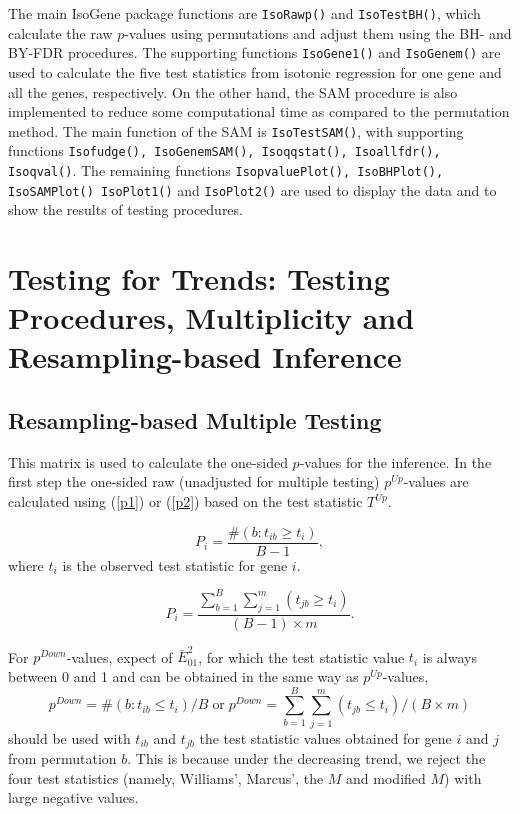 The main IsoGene package functions are \texttt{IsoRawp()} and
\texttt{IsoTestBH()}, which calculate the raw $p$-values using
permutations and adjust them using the BH- and BY-FDR procedures.
The supporting functions \texttt{IsoGene1()} and \texttt{IsoGenem()}
are used to calculate the five test statistics from isotonic
regression for one gene and all the genes, respectively. On the other hand,
the SAM procedure is also implemented to reduce some computational time as
compared to the permutation method. The main function of the SAM is \texttt{IsoTestSAM()},
with supporting functions \texttt{Isofudge(), IsoGenemSAM(), Isoqqstat(), Isoallfdr(), Isoqval()}.
The remaining functions \texttt{IsopvaluePlot(), IsoBHPlot(), IsoSAMPlot()
IsoPlot1()} and \texttt{IsoPlot2()} are used to display the data and
to show the results of testing procedures.

\section{Testing for Trends: Testing Procedures, Multiplicity and Resampling-based Inference}
\subsection{Resampling-based Multiple Testing}


This matrix is used to calculate the one-sided $p$-values for the
inference. In the first step the one-sided raw (unadjusted for
multiple testing) $p^{Up}$-values are calculated using (\ref{p1}) or
(\ref{p2}) based on the test statistic $T^{Up}$.

\begin{equation}
P_i=\frac{\#(b: t_{ib} \ge t_{i})}{B-1}, \label{p1}
\end{equation}
where $t_i$ is the observed test statistic for gene $i$.

\begin{equation}
P_i=\frac{\sum_{b=1}^{B} \sum_{j=1}^{m} (t_{jb}\ge
t_{i})}{(B-1) \times m} \label{p2}.
\end{equation}

For $p^{Down}$-values, expect of $\bar{E}^2_{01}$, for which the
test statistic value $t_i$ is always between 0 and 1 and can be
obtained in the same way as $p^{Up}$-values,
\[p^{Down}=\#(b:t_{ib} \le t_{i})/B\; \mbox{or}\; p^{Down}=\sum_{b=1}^{B}
\sum_{j=1}^{m} (t_{jb} \le t_{i})/(B \times m)\] should be used
with $t_{ib}$ and $t_{jb}$ the test statistic values obtained for
gene $i$ and $j$ from permutation $b$. This is because under the
decreasing trend, we reject the four test statistics (namely,
Williams', Marcus', the $M$ and modified $M$) with large negative
values.

